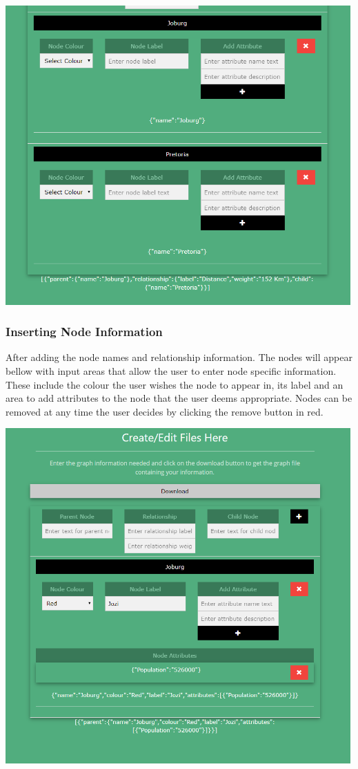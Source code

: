 \documentclass[english]{article}
\begin{document}
\includegraphics[width=500px]{InterfaceScreenshots/NewNodes.PNG}

\subsubsection{Inserting Node Information}
After adding the node names and relationship information. The nodes will appear bellow with input areas that allow the user to enter node specific information. These include the colour the user wishes the node to appear in, its label and an area to add attributes to the node that the user deems appropriate. Nodes can be removed at any time the user decides by clicking the remove button in red.

\includegraphics[width=500px]{InterfaceScreenshots/AttributeAdded.PNG}
\end{document}
